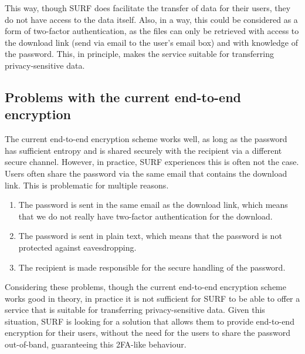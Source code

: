 This way, though SURF does facilitate the transfer of data for their users, they do not have access to the data itself.
Also, in a way, this could be considered as a form of two-factor authentication, as the files can only be retrieved with access to the download link (send via email to the user's email box) and with knowledge of the password.
This, in principle, makes the service suitable for transferring privacy-sensitive data.

\subsection{Problems with the current end-to-end encryption}\label{subsec:problems-with-the-current-end-to-end-encryption}
The current end-to-end encryption scheme works well, as long as the password has sufficient entropy and is shared securely with the recipient via a different secure channel.
However, in practice, SURF experiences this is often not the case.
Users often share the password via the same email that contains the download link.
This is problematic for multiple reasons.

\begin{enumerate}
    \item The password is sent in the same email as the download link, which means that we do not really have two-factor authentication for the download.
    \item The password is sent in plain text, which means that the password is not protected against eavesdropping.
    \item The recipient is made responsible for the secure handling of the password.
\end{enumerate}

Considering these problems, though the current end-to-end encryption scheme works good in theory, in practice it is not sufficient for SURF to be able to offer a service that is suitable for transferring privacy-sensitive data.
Given this situation, SURF is looking for a solution that allows them to provide end-to-end encryption for their users, without the need for the users to share the password out-of-band, guaranteeing this 2FA-like behaviour.

